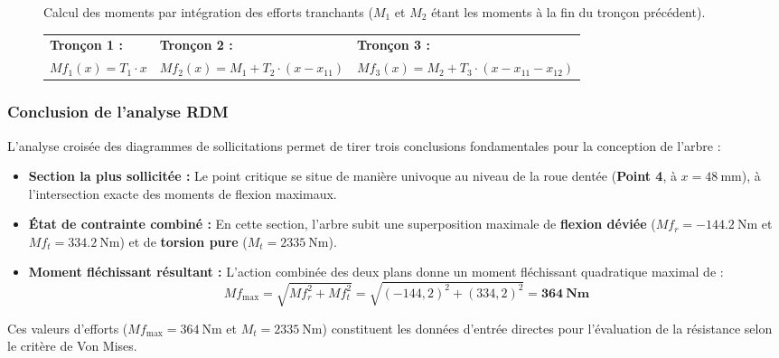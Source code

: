 \documentclass[11pt,a4paper]{article}
\begin{document}
\begin{figure}[H]
    \vspace{0.3cm}
    \begin{tcolorbox}[colback=BoxBg, colframe=gray!50, arc=2pt, boxrule=0.5pt, left=2pt, right=2pt, top=2pt, bottom=2pt]
    \small \centering
    Calcul des moments par intégration des efforts tranchants ($M_1$ et $M_2$ étant les moments à la fin du tronçon précédent).\\
    \begin{tabularx}{\linewidth}{>{\centering\arraybackslash}X >{\centering\arraybackslash}X >{\centering\arraybackslash}X}
        \textbf{Tronçon 1 :} & \textbf{Tronçon 2 :} & \textbf{Tronçon 3 :} \\
        $Mf_1(x) = T_1 \cdot x$ & $Mf_2(x) = M_1 + T_2 \cdot (x - x_{11})$ & $Mf_3(x) = M_2 + T_3 \cdot (x - x_{11} - x_{12})$
    \end{tabularx}
    \end{tcolorbox}
\end{figure}

\subsubsection*{Conclusion de l'analyse RDM}
\begin{tcolorbox}[colback=BoxBg, colframe=TealAccent, arc=4pt, boxrule=1pt, title=\textbf{Synthèse de l'analyse RDM et identification de la section critique}]
L'analyse croisée des diagrammes de sollicitations permet de tirer trois conclusions fondamentales pour la conception de l'arbre :
\begin{itemize}
    \item \textbf{Section la plus sollicitée :} Le point critique se situe de manière univoque au niveau de la roue dentée (\textbf{Point 4}, à $x = \qty{48}{\milli\meter}$), à l'intersection exacte des moments de flexion maximaux.
    \item \textbf{État de contrainte combiné :} En cette section, l'arbre subit une superposition maximale de \textbf{flexion déviée} ($Mf_r = \qty{-144,2}{\newton\meter}$ et $Mf_t = \qty{334,2}{\newton\meter}$) et de \textbf{torsion pure} ($M_t = \qty{2335}{\newton\meter}$). 
    \item \textbf{Moment fléchissant résultant :} L'action combinée des deux plans donne un moment fléchissant quadratique maximal de :
    \[ Mf_{\max} = \sqrt{Mf_r^2 + Mf_t^2} = \sqrt{(-144{,}2)^2 + (334{,}2)^2} = \mathbf{\qty{364}{\newton\meter}} \]
\end{itemize}
Ces valeurs d'efforts ($Mf_{\max} = \qty{364}{\newton\meter}$ et $M_t = \qty{2335}{\newton\meter}$) constituent les données d'entrée directes pour l'évaluation de la résistance selon le critère de Von Mises.
\end{tcolorbox}
\end{document}
